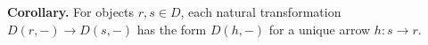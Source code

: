 \textbf{Corollary.} For objects $r, s \in D$, each natural transformation $D(r, -) \to D(s, -)$ has the form $D(h, -)$ for a unique arrow $h: s \to r$.
